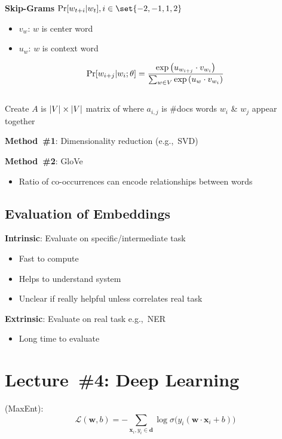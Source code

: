\documentclass[9pt]{extarticle}
\renewcommand{\green}[1]{{\color{ForestGreen} #1}}
\begin{document}
\begin{multicols}{3}
  \textbf{\green{Skip-Grams}} ${\Pr\sbrack{w_{t+i} \vert w_{t}}, i \in \set{-2,-1,1,2}}$
  \begin{itemize}
    \item $v_w$: $w$ is center word
    \item $u_w$: $w$ is context word
  \end{itemize}

  \begin{equation*}
    \Pr\lbrack w_{i+j} \vert w_{i} ; \theta\rbrack = \frac{\exp\left(u_{w_{i+j}} \cdot v_{w_i} \right)}{\sum_{w \in V} \exp\left(u_{w} \cdot v_{w_i} \right)}
  \end{equation*}

  \subsection*{}

  Create $A$ is ${\lvert V\rvert \times \lvert V\rvert}$ matrix of where $a_{i,j}$ is \#docs words $w_i$ \& $w_j$ appear together

  \green{\textbf{Method~\#1}}: Dimensionality reduction (e.g.,~SVD)

  \green{\textbf{Method~\#2}}: GloVe
  \begin{itemize}
    \item Ratio of co-occurrences can encode relationships between words
  \end{itemize}

  \subsection*{Evaluation of Embeddings}

  \textbf{\green{Intrinsic}}: Evaluate on specific/intermediate task
  \begin{itemize}
    \item Fast to compute
    \item Helps to understand system
    \item Unclear if really helpful unless correlates real task
  \end{itemize}

  \textbf{\green{Extrinsic}}: Evaluate on real task e.g.,~NER
  \begin{itemize}
    \item Long time to evaluate
  \end{itemize}

  \section*{Lecture~\#4: Deep Learning}
  \textbf{} (MaxEnt):
  \begin{equation*}\label{eq:L04:LogReg}
    \mathcal{L}(\mathbf{w},b) = -\sum_{\mathbf{x}_i,y_i \in \mathbf{d}} \log \sigma\big( y_i(\mathbf{w}\cdot \mathbf{x}_i + b) \big)
  \end{equation*}


\end{multicols}
\end{document}
